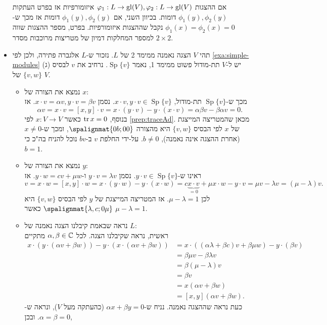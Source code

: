 \documentclass{report}
\theoremstyle{break}
\theoremstyle{MyNonumberbreak}
\DeclareMathOperator{\Sp}{Sp}
\begin{document}
\begin{itemize}
	אם ההצגות $\varphi_1 : L \to \operatorname{gl}(V), \varphi_2 : L \to \operatorname{gl}(V)$ איזומורפיות אז בפרט העתקות $\phi_1(y), \phi_2(y)$ דומות. בכיוון השני, אם $\phi_1(y), \phi_2(y)$ דומות אז מכך ש-$\phi_1(x) = \phi_2(x) = 0$ נקבל שההצגות איזומורפיות. בפרט, מספר ההצגות שווה למספר המחלקות דמיון של מטריצות מרוכבות מסדר $2 \times 2$.
	\item
	תהי $V$ הצגה נאמנה ממימד 2 של $L$. נזכור ש-$L$ אלגברה פתירה, ולכן לפי \autoref*{exa:simple-modules} (ג) יש ל-$V$ תת-מודול פשוט ממימד 1, נאמר $\Sp\{v\}$. נרחיב את $v$ לבסיס $\{v, w\}$ של $V$.
	\begin{itemize}
		\item 
		נמצא את הצורה של $x$: \\
		מכך ש-$\Sp\{v\}$ תת-מודול, $x \cdot v, y \cdot v \in \Sp\{v\}$. נסמן $x \cdot v = \alpha v, y \cdot v = \beta v$. אז
	\[ \alpha v = x \cdot v = [x, y] \cdot v = x \cdot (y \cdot v) - y \cdot (x \cdot v) = \alpha\beta v - \beta\alpha v = 0. \]
		בנוסף, $\operatorname{tr} x = 0$ כאשר $x : V \to V$ לפי \autoref*{prep:traceAd}. מכאן שהמטריצה המייצגת של $x$ לפי הבסיס $\{v, w\}$ היא מהצורה $\spalignmat{0 b ; 0 0}$, ומכך ש-$x \neq 0$ (אחרת ההצגה אינה נאמנה), $b \neq 0$. על-ידי החלפת $v$ ב-$bv$ נוכל להניח בה"כ כי $b = 1$.
		\item
		נמצא את הצורה של $y$: \\
		ראינו ש-$y \cdot v \in \Sp\{v\}$. נסמן $y \cdot v = \lambda v$ ו-$y \cdot w = cv + \mu w$. אז
	\[ v = x \cdot w = [x, y] \cdot w = x \cdot (y \cdot w) - y \cdot (x \cdot w) = c \underbrace{x \cdot v}_{=0} + \mu x \cdot w - y \cdot v = \mu v - \lambda v = (\mu - \lambda)v. \]
		לכן $\mu - \lambda = 1$. אז המטריצה המייצגת של $y$ לפי הבסיס $\{v, w\}$ היא $\spalignmat{\lambda, c ; 0 \mu}$ כאשר $\mu - \lambda = 1$.
		\item
		נראה שבאמת קיבלנו הצגה נאמנה של $L$: \\
		ראשית, נראה שקיבלנו הצגה. לכל $\alpha, \beta \in \operatorname{\mathbb{C}}$ מתקיים
		\begin{align*}
			x \cdot (y \cdot (\alpha v + \beta w)) - y \cdot (x \cdot (\alpha v + \beta w)) &= x \cdot ((\alpha\lambda + \beta c)v + \beta\mu w) - y \cdot (\beta v) \\
				&= \beta\mu v - \beta\lambda v \\
				&= \beta(\mu - \lambda)v \\
				&= \beta v \\
				&= x(\alpha v + \beta w) \\
				&= [x, y](\alpha v + \beta w).
		\end{align*}
		כעת נראה שההצגה נאמנה. נניח ש-$\alpha x + \beta y = 0$ (כהעתקה מעל $V$), ונראה ש-$\alpha = \beta = 0$. ובכן,

\end{itemize}
\end{itemize}
\end{document}
